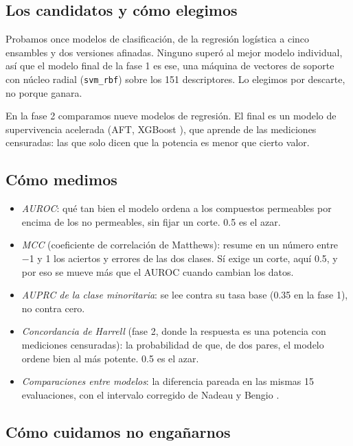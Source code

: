 \documentclass[letterpaper,11pt]{article}
\providecommand{\tightlist}{\setlength{\itemsep}{0pt}\setlength{\parskip}{0pt}}
\begin{document}
\subsection{Los candidatos y cómo elegimos}

Probamos once modelos de clasificación, de la regresión logística a cinco ensambles y dos versiones afinadas. Ninguno superó al mejor modelo individual, así que el modelo final de la fase 1 es ese, una máquina de vectores de soporte con núcleo radial (\texttt{svm\_rbf}) sobre los 151 descriptores. Lo elegimos por descarte, no porque ganara.

En la fase 2 comparamos nueve modelos de regresión. El final es un modelo de supervivencia acelerada (AFT, XGBoost \autocite{chen2016xgboost}), que aprende de las mediciones censuradas: las que solo dicen que la potencia es menor que cierto valor.

\subsection{Cómo medimos}

\begin{itemize}
\tightlist
\item
  \emph{AUROC}: qué tan bien el modelo ordena a los compuestos permeables por encima de los no permeables, sin fijar un corte. 0.5 es el azar.
\item
  \emph{MCC} (coeficiente de correlación de Matthews): resume en un número entre −1 y 1 los aciertos y errores de las dos clases. Sí exige un corte, aquí 0.5, y por eso se mueve más que el AUROC cuando cambian los datos.
\item
  \emph{AUPRC de la clase minoritaria}: se lee contra su tasa base (0.35 en la fase 1), no contra cero.
\item
  \emph{Concordancia de Harrell} (fase 2, donde la respuesta es una potencia con mediciones censuradas): la probabilidad de que, de dos pares, el modelo ordene bien al más potente. 0.5 es el azar.
\item
  \emph{Comparaciones entre modelos}: la diferencia pareada en las mismas 15 evaluaciones, con el intervalo corregido de Nadeau y Bengio \autocite{nadeau2003inference}.
\end{itemize}

\subsection{Cómo cuidamos no engañarnos}
\end{document}
